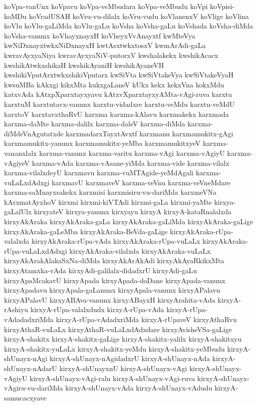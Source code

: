 {koVpa-vanUnx
koVpavu
koVpa-veMbudara
koVpa-veMbudu
koVpi
koVpisi-koMDu
koVradUSAH
koVru-vu-dilalx
koVru-vudu
koVlanenxV
koVlige
koVlina
koVlu
koVlu-gaLiMda
koVlu-gaLu
koVsha
koVsha-gaLu
koVshada
koVsha-diMda
koVsha-vanunx
koVhayxnayxH
koVheyxVvAnayxtf
kwMteVya
kwNiDxnayxtwkxNiDxnayxH
kwtAsxtwkxtosxV
kwmArAdi-gaLa
kwravAyxyaNiya
kwravAyxyaNiV-putorxV
kwshalakekx
kwshikAcacx
kwshikAtwkxshikaH
kwshikAyaniH
kwshikAyaneVH
kwshikiVputArxtwkxshikiVputarx
kwSiVta
kwSiVtakeVya
kwSiVtakeVyaH
kwsuMBa
kAkxgi
kikxMta
kukxgaLaneV
kUkx
kekx
kekxVna
kokxMdu
katxvAda
kAtxpXparxtayxyavu
kAtxvXparxtayxyAMta-vAgi-ruva
karxtu
karxtuM
karxtutavx-vanunx
karxtu-vidadxre
karxtu-veMdu
karxtu-veMdU
karxtoV
karxtavxthaRvU
karxma
karxma-kAlavu
karxmakekx
karxmada
karxma-daMte
karxma-dalilx
karxma-daleV
karxma-diMda
karxma-diMdeVnAgutatxde
karxmadarxTayxtAvxtf
karxmanu
karxmamukitx-gAgi
karxmamukitx-yanunx
karxmamukitx-yeMba
karxmamukitxyeV
karxma-vananxlalx
karxma-vanunx
karxma-varitu
karxma-vAgi
karxma-vAgiyU
karxma-vAgiyeV
karxma-vAda
karxma-vAsane-yiMda
karxma-vide
karxma-vilalx
karxma-vilalxdeyU
karxmavu
karxma-vuMTAgide-yeMdAgali
karxma-vuLaLxdAdxgi
karxmavU
karxmaveV
karxma-veVnu
karxma-veVneMdare
karxma-saMnayxsakekx
karxmisi
karxmisiru-vu-dariMda
karxmeVNa
kArxmatAyxhoV
kirxmi
kirxmi-kiVTAdi
kirxmi-gaLa
kirxmi-yaMte
kirxya-gaLalUlx
kirxyateV
kirxya-yanunx
kirxyayu
kirxyA
kirxyA-kataRnalalxda
kirxyAkAraka
kirxyAkAraka-gaLa
kirxyAkAraka-gaLiMda
kirxyAkAraka-gaLige
kirxyAkAraka-gaLeMba
kirxyAkAraka-BeVda-gaLige
kirxyAkAraka-rUpa-valalxda
kirxyAkAraka-rUpa-vAda
kirxyAkAraka-rUpa-vuLaLx
kirxyAkAraka-rUpa-vuLaLxdAdxgi
kirxyAkAraka-vilalxda
kirxyAkAraka-vuLaLx
kirxyAkArakAlakaSxNa-diMda
kirxyAkArAkAdi
kirxyAkAyaRkikxMta
kirxyAtamxka-vAda
kirxyAdi-galilalx-didadxrU
kirxyAdi-gaLu
kirxyApaMcakavU
kirxyApada
kirxyApada-doDane
kirxyApada-vanunx
kirxyApadavu
kirxyApala-gaLanunx
kirxyApala-vanunx
kirxyAPalavu
kirxyAPalavU
kirxyABAva-vanunx
kirxyABayxH
kirxyArahita-vAda
kirxyA-rAshiyu
kirxyA-rUpa-valalxdudx
kirxyA-rUpa-vAda
kirxyA-rUpa-vAdadadxriMda
kirxyA-rUpa-vAdadxriMda
kirxyA-rUpaveV
kirxyAthaRvu
kirxyAthaR-vuLaLx
kirxyAthaR-vuLaLxdAdxdare
kirxyAvisheVSa-gaLige
kirxyA-shakitx
kirxyA-shakitx-gaLige
kirxyA-shakitx-yalilx
kirxyA-shakitxyu
kirxyA-shakitx-yuLaLx
kirxyA-shakitx-yeMdu
kirxyA-shakitx-yeMbudu
kirxyA-shUnayx-nAgi
kirxyA-shUnayx-nAgidadxrU
kirxyA-shUnayx-nAda
kirxyA-shUnayx-nAdarU
kirxyA-shUnayxnU
kirxyA-shUnayx-vAgi
kirxyA-shUnayx-vAgiyU
kirxyA-shUnayx-vAgi-ralu
kirxyA-shUnayx-vAgi-ruva
kirxyA-shUnayx-vAgiru-vu-dariMda
kirxyA-shUnayx-vAda
kirxyA-shUnayx-vAdudu
kirxyA-samucacxyave
}
